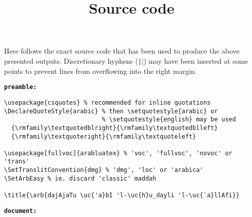 \documentclass[fontsize=12pt, paper=letter, DIV=classic]{scrartcl}
\begin{document}
\makeatletter
\def\al@mode{voc}
\makeatother
\singlespacing
{}
\titlehead{}
\title{\large Source code}
\subtitle{}
\maketitle
\vspace{-1in}

\label{source}
Here follows the exact source code that has been used to produce the
above presented outputs. Discretionary hyphens
(\texttt|\-|) may have been inserted at some points to
prevent lines from overflowing into the right margin.

\medskip

\noindent\textbf{\texttt{preamble:}}
\begin{verbatim}
\usepackage{csquotes} % recommended for inline quotations
\DeclareQuoteStyle{arabic} % then \setquotestyle{arabic} or
                           % \setquotestyle{english} may be used
  {\rmfamily\textquotedblright}{\rmfamily\textquotedblleft}
  {\rmfamily\textquoteright}{\rmfamily\textquoteleft}

\usepackage[fullvoc]{arabluatex} % 'voc', 'fullvoc', 'novoc' or 'trans'
\SetTranslitConvention{dmg} % 'dmg', 'loc' or 'arabica'
\SetArbEasy % ie. discard 'classic' maddah

\title{\arb{dajAjaTu \uc{'a}bI 'l-\uc{h}u_dayli 'l-\uc{`a}llAfi}}
\end{verbatim}
\textbf{\texttt{document:}}
\inputminted[linenos, firstnumber=last, bgcolor=bg]{latex}{TMP/dajaja.tex}
\end{document}
